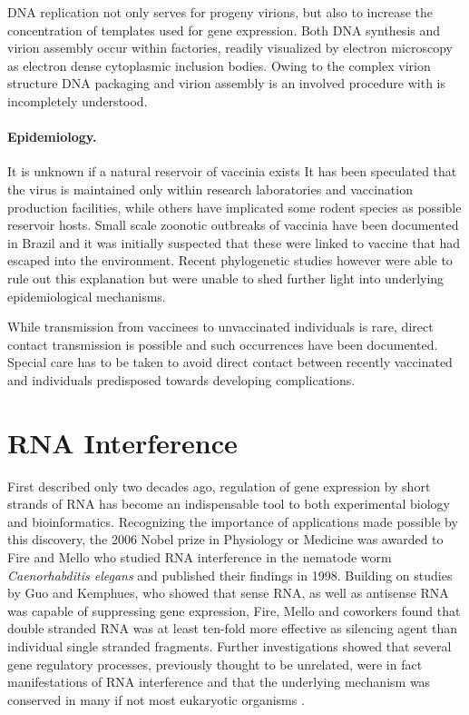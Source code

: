 DNA replication not only serves for progeny virions, but also to increase the concentration of templates used for gene expression. Both DNA synthesis and virion assembly occur within factories, readily visualized by electron microscopy as electron dense cytoplasmic inclusion bodies. Owing to the complex virion structure DNA packaging and virion assembly is an involved procedure with is incompletely understood.

\paragraph{Epidemiology.}
It is unknown if a natural reservoir of vaccinia exists It has been speculated that the virus is maintained only within research laboratories and vaccination production facilities, while others have implicated some rodent species as possible reservoir hosts. Small scale zoonotic outbreaks of vaccinia have been documented in Brazil and it was initially suspected that these were linked to vaccine that had escaped into the environment. Recent phylogenetic studies however were able to rule out this explanation but were unable to shed further light into underlying epidemiological mechanisms.

While transmission from vaccinees to unvaccinated individuals is rare, direct contact transmission is possible and such occurrences have been documented. Special care has to be taken to avoid direct contact between recently vaccinated and individuals predisposed towards developing complications.

\section{RNA Interference}
First described only two decades ago, regulation of gene expression by short strands of RNA has become an indispensable tool to both experimental biology and bioinformatics. Recognizing the importance of applications made possible by this discovery, the 2006 Nobel prize in Physiology or Medicine was awarded to Fire and Mello who studied RNA interference in the nematode worm \textit{Caenorhabditis elegans} and published their findings in 1998. Building on studies by Guo and Kemphues, who showed that sense RNA, as well as antisense RNA was capable of suppressing gene expression, Fire, Mello and coworkers found that double stranded RNA was at least ten-fold more effective as silencing agent than individual single stranded fragments. Further investigations showed that several gene regulatory processes, previously thought to be unrelated, were in fact manifestations of RNA interference and that the underlying mechanism was conserved in many if not most eukaryotic organisms \citep{Hannon2002}.

